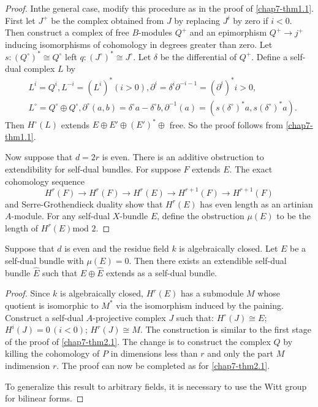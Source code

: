 \begin{proof}
In\pageoriginale the general case, modify this procedure as in the
proof of \ref{chap7-thm1.1}. First let $J^{+}$ be the complex obtained
from $J$ by replacing $J^{i}$ by zero if $i<0$. Then construct a
complex of free $B$-modules $Q^{+}$ and an epimorphism $Q^{+}\to
j^{+}$ inducing isomorphisms of cohomology in degrees greater than
zero. Let $s:(Q^{\circ})^{\ast}\cong Q^{\circ}$ left
$q:(J^{\circ})^{\ast}\cong J^{\circ}$. Let $\delta$ be the
differential of $Q^{+}$. Define a self-dual complex $L$ by
\begin{align*}
& L^{i}=Q^{i},
L^{-i}=(L^{i})^{\ast}(i>0), \partial^{i}=\delta^{i}\partial^{-i-1}=(\partial^{i})^{\ast}i>0,\\[3pt]
& L^{\circ}=Q^{\circ}\oplus Q^{\circ},\partial^{\circ}(a,b)=\delta^{\circ}a-\delta^{\circ}b,\partial^{-1}(a)=(s(\delta^{\circ})^{\ast}a,s(\delta^{\circ})^{\ast}a).
\end{align*}
Then $H^{\circ}(L)$ extends $E\oplus E'\oplus (E')^{\ast}\oplus$
free. So the proof follows from \ref{chap7-thm1.1}.

Now suppose that $d=2r$ is even. There is an additive obstruction to
extendibility for self-dual bundles. For suppose $F$ extends $E$. The
exact cohomology sequence 
$$
H^{r}(F)\to H^{r}(F)\to H^{r}(E)\to H^{r+1}(F)\to H^{r+1}(F)
$$
and Serre-Grothendieck duality show that $H^{r}(E)$ has even length as
an artinian $A$-module. For any self-dual $X$-bundle $E$, define the
obstruction $\mu(E)$ to be the length of $H^{r}(E)\text{mod~}2$.
\end{proof}

\begin{theorem}\label{chap7-thm2.2}
Suppose that $d$ is even and the residue field $k$ is algebraically
closed. Let $E$ be a self-dual bundle with $\mu(E)=0$. Then there
exists an extendible self-dual bundle $\widehat{E}$ such that
$E\oplus \widehat{E}$ extends as a self-dual bundle.
\end{theorem}

\begin{proof}
Since $k$ is algebraically closed, $H^{r}(E)$ has a submodule $M$
whose quotient is isomorphic to $M^{\ast}$ via the isomorphism induced
by the paining. Construct a self-dual $A$-projective complex $J$ such
that: $H^{\circ}(J)\cong E$; $H^{i}(J)=0\,(i<0)$; $H^{r}(J)\cong M$. The
construction is similar to the first stage of the proof
of \ref{chap7-thm2.1}. The change is to construct the complex $Q$ by
killing the cohomology of $P$ in dimensions less than $r$ and only the
part $M$ in\pageoriginale dimension $r$. The proof can now be
completed as for \ref{chap7-thm2.1}.

To generalize this result to arbitrary fields, it is necessary to use
the Witt group for bilinear forms.
\end{proof}


